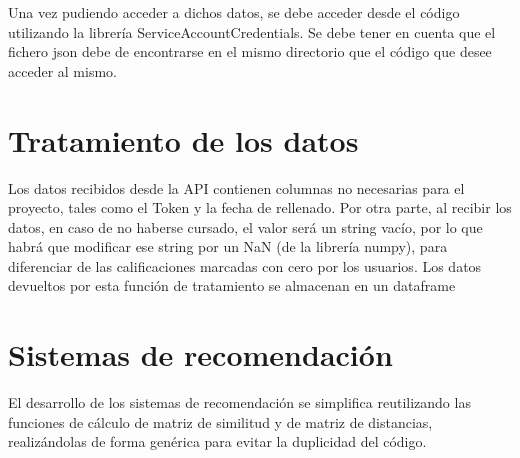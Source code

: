 Una vez pudiendo acceder a dichos datos, se debe acceder desde el código utilizando la librería ServiceAccountCredentials. Se debe tener en cuenta que el fichero json debe de encontrarse en el mismo directorio que el código que desee acceder al mismo. 


\section{Tratamiento de los datos}
Los datos recibidos desde la API contienen columnas no necesarias para el proyecto, tales como el Token y la fecha de rellenado. Por otra parte, al recibir los datos, en caso de no haberse cursado, el valor será un string vacío, por lo que habrá que modificar ese string por un NaN (de la librería numpy), para diferenciar de las calificaciones marcadas con cero por los usuarios.   Los datos devueltos por esta función de tratamiento se almacenan en un dataframe

\section{Sistemas de recomendación}
El desarrollo de los sistemas de recomendación se simplifica reutilizando las funciones de cálculo de matriz de similitud y de matriz de distancias, realizándolas de forma genérica para evitar la duplicidad del código. 
